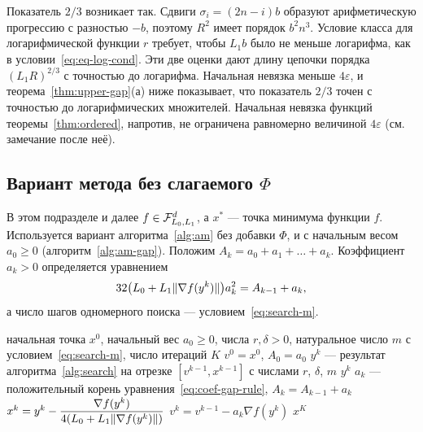 Показатель $2/3$ возникает так. Сдвиги $\sigma_i=(2n-i)b$ образуют арифметическую прогрессию с разностью $-b$, поэтому $R^2$ имеет порядок $b^2n^3$. Условие класса для логарифмической функции $r$ требует, чтобы $L_1b$ было не меньше логарифма, как в условии~\eqref{eq:eq-log-cond}. Эти две оценки дают длину цепочки порядка $(L_1R)^{2/3}$ с точностью до логарифма. Начальная невязка меньше $4\varepsilon$, и теорема~\ref{thm:upper-gap}(а) ниже показывает, что показатель $2/3$ точен с точностью до логарифмических множителей. Начальная невязка функций теоремы~\ref{thm:ordered}, напротив, не ограничена равномерно величиной $4\varepsilon$ (см. замечание после неё).


\subsection{Вариант метода без слагаемого \texorpdfstring{$\Phi$}{Φ}}\label{sec:gap-method}

В этом подразделе и далее $f\in\mathcal F_{L_0,L_1}^d$, а $x^\ast$ --- точка минимума функции $f$. Используется вариант алгоритма~\ref{alg:am} без добавки $\Phi$, и с начальным весом $a_0\ge0$ (алгоритм~\ref{alg:am-gap}). Положим $A_k=a_0+a_1+\dots+a_k$. Коэффициент $a_k>0$ определяется уравнением
\begin{equation}\label{eq:coef-gap-rule}
 32\bigl(L_0+L_1\|\nabla f(y^k)\|\bigr)a_k^2=A_{k-1}+a_k ,
\end{equation}
а число шагов одномерного поиска --- условием~\eqref{eq:search-m}.

\begin{algorithm}[ht]
\caption{Вариант метода SHERPA без слагаемого $\Phi$}\label{alg:am-gap}
\begin{algorithmic}[1]
\Require начальная точка $x^0$, начальный вес $a_0\ge0$, числа $r,\delta>0$, натуральное число $m$ с условием~\eqref{eq:search-m}, число итераций $K$
\State $v^0=x^0$, $A_0=a_0$
 \State $y^k$ --- результат алгоритма~\ref{alg:search} на отрезке $[v^{k-1},x^{k-1}]$ с числами $r$, $\delta$, $m$
  \State \Return $y^k$
 \EndIf
 \State $a_k$ --- положительный корень уравнения~\eqref{eq:coef-gap-rule}, $A_k=A_{k-1}+a_k$
 \State $x^k=y^k-\dfrac{\nabla f(y^k)}{4(L_0+L_1\|\nabla f(y^k)\|)}$
 \State $v^k=v^{k-1}-a_k\nabla f(y^k)$
\EndFor
\State \Return $x^K$
\end{algorithmic}
\end{algorithm}

